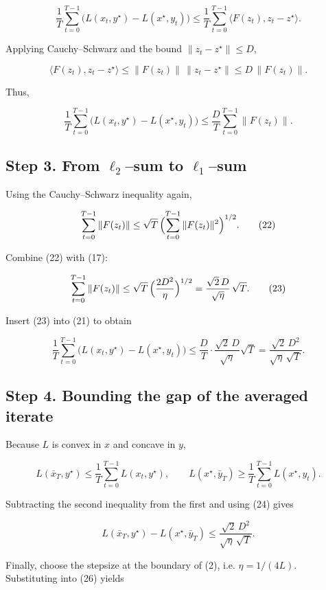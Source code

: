 \documentclass{article}
\begin{document}
\[
\frac{1}{T}\sum_{t=0}^{T-1}\bigl(L(x_t,y^{\star})-L(x^{\star},y_t)\bigr)
\le
\frac{1}{T}\sum_{t=0}^{T-1}\langle F(z_t),z_t-z^{\star}\rangle. \tag{19}
\]

Applying Cauchy–Schwarz and the bound \(\|z_t-z^{\star}\|\le D\),

\[
\langle F(z_t),z_t-z^{\star}\rangle
\le \|F(z_t)\|\,\|z_t-z^{\star}\|
\le D\,\|F(z_t)\|. \tag{20}
\]

Thus,

\[
\frac{1}{T}\sum_{t=0}^{T-1}\bigl(L(x_t,y^{\star})-L(x^{\star},y_t)\bigr)
\le
\frac{D}{T}\sum_{t=0}^{T-1}\|F(z_t)\|. \tag{21}
\]

\subsection*{Step 3. From \(\ell_2\)–sum to \(\ell_1\)–sum}
Using the Cauchy–Schwarz inequality again,

\[
\sum_{t=0}^{T-1}\|F(z_t)\|
\le \sqrt{T}\,\Bigl(\sum_{t=0}^{T-1}\|F(z_t)\|^{2}\Bigr)^{1/2}. \tag{22}
\]

Combine (22) with (17):

\[
\sum_{t=0}^{T-1}\|F(z_t)\|
\le \sqrt{T}\,\Bigl(\frac{2D^{2}}{\eta}\Bigr)^{1/2}
= \frac{\sqrt{2}\,D}{\sqrt{\eta}}\,\sqrt{T}. \tag{23}
\]

Insert (23) into (21) to obtain

\[
\frac{1}{T}\sum_{t=0}^{T-1}\bigl(L(x_t,y^{\star})-L(x^{\star},y_t)\bigr)
\le
\frac{D}{T}\cdot\frac{\sqrt{2}\,D}{\sqrt{\eta}}\sqrt{T}
= \frac{\sqrt{2}\,D^{2}}{\sqrt{\eta}\, \sqrt{T}}. \tag{24}
\]

\subsection*{Step 4. Bounding the gap of the averaged iterate}
Because \(L\) is convex in \(x\) and concave in \(y\),

\[
L(\bar x_T,y^{\star})\le \frac{1}{T}\sum_{t=0}^{T-1}L(x_t,y^{\star}),\qquad
L(x^{\star},\bar y_T)\ge \frac{1}{T}\sum_{t=0}^{T-1}L(x^{\star},y_t). \tag{25}
\]

Subtracting the second inequality from the first and using (24) gives

\[
L(\bar x_T,y^{\star})-L(x^{\star},\bar y_T)
\le \frac{\sqrt{2}\,D^{2}}{\sqrt{\eta}\,\sqrt{T}}. \tag{26}
\]

Finally, choose the stepsize at the boundary of (2), i.e. \(\eta = 1/(4L)\).  Substituting into (26) yields
\end{document}
